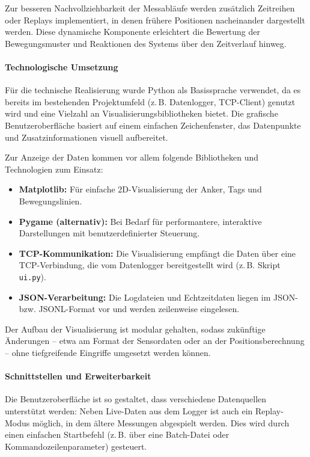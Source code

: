 \documentclass[a4paper, 12pt]{article} %
\begin{document}
Zur besseren Nachvollziehbarkeit der Messabläufe werden zusätzlich Zeitreihen oder Replays implementiert, in denen 
frühere Positionen nacheinander dargestellt werden. Diese dynamische Komponente erleichtert die Bewertung der Bewegungsmuster und 
Reaktionen des Systems über den Zeitverlauf hinweg.

\paragraph{Technologische Umsetzung}

Für die technische Realisierung wurde Python als Basissprache verwendet, da es bereits im bestehenden Projektumfeld (z.\,B. Datenlogger, TCP-Client)
 genutzt wird und eine Vielzahl an Visualisierungsbibliotheken bietet. Die grafische Benutzeroberfläche basiert auf einem einfachen Zeichenfenster, das 
 Datenpunkte und Zusatzinformationen visuell aufbereitet. 

Zur Anzeige der Daten kommen vor allem folgende Bibliotheken und Technologien zum Einsatz:

\begin{itemize}
    \item \textbf{Matplotlib:} Für einfache 2D-Visualisierung der Anker, Tags und Bewegungslinien.
    \item \textbf{Pygame (alternativ):} Bei Bedarf für performantere, interaktive Darstellungen mit benutzerdefinierter Steuerung.
    \item \textbf{TCP-Kommunikation:} Die Visualisierung empfängt die Daten über eine TCP-Verbindung, die vom Datenlogger bereitgestellt wird (z.\,B. Skript \texttt{ui.py}).
    \item \textbf{JSON-Verarbeitung:} Die Logdateien und Echtzeitdaten liegen im JSON- bzw. JSONL-Format vor und werden zeilenweise eingelesen.
\end{itemize}

Der Aufbau der Visualisierung ist modular gehalten, sodass zukünftige Änderungen – etwa am Format der Sensordaten oder an der
 Positionsberechnung – ohne tiefgreifende Eingriffe umgesetzt werden können.

\paragraph{Schnittstellen und Erweiterbarkeit}

Die Benutzeroberfläche ist so gestaltet, dass verschiedene Datenquellen unterstützt werden: Neben Live-Daten aus dem Logger ist auch ein 
Replay-Modus möglich, in dem ältere Messungen abgespielt werden. Dies wird durch einen einfachen Startbefehl (z.\,B. über eine Batch-Datei oder
 Kommandozeilenparameter) gesteuert.
\end{document}
